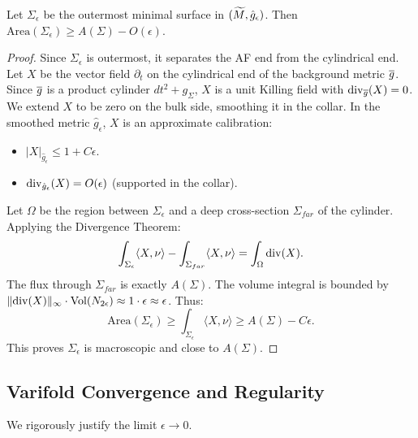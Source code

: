 \begin{lemma}
Let $\Sigma_\epsilon$ be the outermost minimal surface in $(\widetilde{M}, \hat{g}_\epsilon)$. Then $\mathrm{Area}(\Sigma_\epsilon) \ge A(\Sigma) - O(\epsilon)$.
\end{lemma}
\begin{proof}
Since $\Sigma_\epsilon$ is outermost, it separates the AF end from the cylindrical end.
Let $X$ be the vector field $\partial_t$ on the cylindrical end of the background metric $\overline{g}$. Since $\overline{g}$ is a product cylinder $dt^2 + g_\Sigma$, $X$ is a unit Killing field with $\mathrm{div}_{\overline{g}}(X)=0$.
We extend $X$ to be zero on the bulk side, smoothing it in the collar.
In the smoothed metric $\hat{g}_\epsilon$, $X$ is an approximate calibration:
\begin{itemize}
    \item $|X|_{\hat{g}_\epsilon} \le 1 + C\epsilon$.
    \item $\mathrm{div}_{\hat{g}_\epsilon}(X) = O(\epsilon)$ (supported in the collar).
\end{itemize}
Let $\Omega$ be the region between $\Sigma_\epsilon$ and a deep cross-section $\Sigma_{far}$ of the cylinder.
Applying the Divergence Theorem:
\[ \int_{\Sigma_\epsilon} \langle X, \nu \rangle - \int_{\Sigma_{far}} \langle X, \nu \rangle = \int_\Omega \mathrm{div}(X). \]
The flux through $\Sigma_{far}$ is exactly $A(\Sigma)$.
The volume integral is bounded by $\|\mathrm{div}(X)\|_\infty \cdot \mathrm{Vol}(N_{2\epsilon}) \approx 1 \cdot \epsilon \approx \epsilon$.
Thus:
\[ \mathrm{Area}(\Sigma_\epsilon) \ge \int_{\Sigma_\epsilon} \langle X, \nu \rangle \ge A(\Sigma) - C\epsilon. \]
This proves $\Sigma_\epsilon$ is macroscopic and close to $A(\Sigma)$.
\end{proof}

\subsection{Varifold Convergence and Regularity}
We rigorously justify the limit $\epsilon \to 0$.

